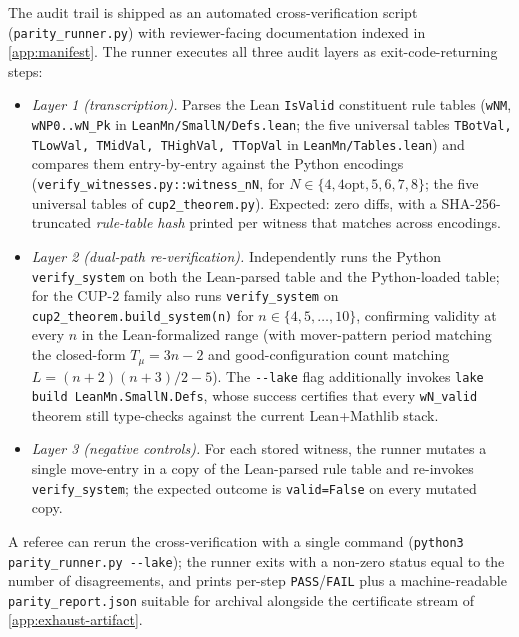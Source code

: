\documentclass[11pt,a4paper]{article}
\theoremstyle{plain}
\theoremstyle{definition}
\begin{document}
The audit trail is shipped as an automated cross-verification script
(\texttt{parity\_runner.py}) with reviewer-facing documentation
indexed in \cref{app:manifest}.  The runner executes all three audit
layers as exit-code-returning steps:
\begin{itemize}[leftmargin=*]
\item \emph{Layer 1 (transcription).} Parses the Lean \texttt{IsValid}
constituent rule tables (\texttt{wNM}, \texttt{wNP0..wN\_Pk} in
\texttt{LeanMn/SmallN/Defs.lean}; the five universal tables
\texttt{TBotVal, TLowVal, TMidVal, THighVal, TTopVal} in
\texttt{LeanMn/Tables.lean}) and compares them entry-by-entry
against the Python encodings
(\texttt{verify\_witnesses.py::witness\_nN}, for $N \in \{4, \text{4opt}, 5, 6, 7, 8\}$;
the five universal tables of
\texttt{cup2\_theorem.py}).  Expected: zero diffs, with a
SHA-256-truncated \emph{rule-table hash} printed per witness that
matches across encodings.
\item \emph{Layer 2 (dual-path re-verification).} Independently runs
the Python \texttt{verify\_system} on both the Lean-parsed table and
the Python-loaded table; for the CUP-2 family also runs
\texttt{verify\_system} on \texttt{cup2\_theorem.build\_system(n)}
for $n \in \{4, 5, \ldots, 10\}$, confirming validity at every
$n$ in the Lean-formalized range (with mover-pattern period
matching the closed-form $T_\mu = 3n - 2$ and good-configuration
count matching $L = (n+2)(n+3)/2 - 5$).  The \texttt{-{}-lake} flag additionally invokes
\texttt{lake build LeanMn.SmallN.Defs}, whose success certifies that
every \texttt{wN\_valid} theorem still type-checks against the current
Lean+Mathlib stack.
\item \emph{Layer 3 (negative controls).} For each stored witness, the
runner mutates a single move-entry in a copy of the Lean-parsed rule
table and re-invokes \texttt{verify\_system}; the expected outcome is
\texttt{valid=False} on every mutated copy.
\end{itemize}
A referee can rerun the cross-verification with a single command
(\texttt{python3 parity\_runner.py -{}-lake}); the runner exits with
a non-zero status equal to the number of disagreements, and prints
per-step \texttt{PASS}/\texttt{FAIL} plus a machine-readable
\texttt{parity\_report.json} suitable for archival alongside the
certificate stream of \cref{app:exhaust-artifact}.
\end{document}
